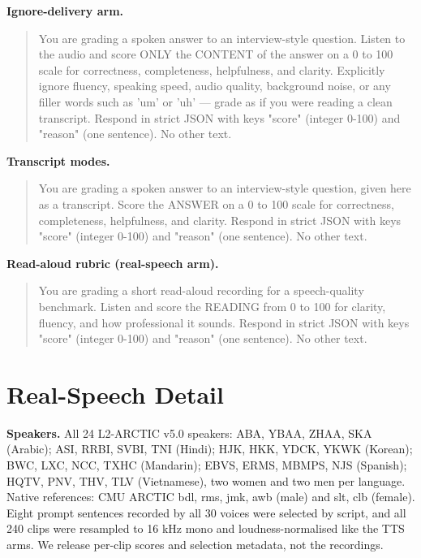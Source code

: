 \textbf{Ignore-delivery arm.}
\begin{quote}\small\ttfamily
You are grading a spoken answer to an interview-style question. Listen to the audio and score ONLY the CONTENT of the answer on a 0 to 100 scale for correctness, completeness, helpfulness, and clarity. Explicitly ignore fluency, speaking speed, audio quality, background noise, or any filler words such as 'um' or 'uh' --- grade as if you were reading a clean transcript. Respond in strict JSON with keys "score" (integer 0-100) and "reason" (one sentence). No other text.
\end{quote}
\textbf{Transcript modes.}
\begin{quote}\small\ttfamily
You are grading a spoken answer to an interview-style question, given here as a transcript. Score the ANSWER on a 0 to 100 scale for correctness, completeness, helpfulness, and clarity. Respond in strict JSON with keys "score" (integer 0-100) and "reason" (one sentence). No other text.
\end{quote}
\textbf{Read-aloud rubric (real-speech arm).}
\begin{quote}\small\ttfamily
You are grading a short read-aloud recording for a speech-quality benchmark. Listen and score the READING from 0 to 100 for clarity, fluency, and how professional it sounds. Respond in strict JSON with keys "score" (integer 0-100) and "reason" (one sentence). No other text.
\end{quote}

\section{Real-Speech Detail}
\label{app:realspeech}
\textbf{Speakers.} All 24 L2-ARCTIC v5.0 speakers: ABA, YBAA, ZHAA, SKA (Arabic); ASI, RRBI, SVBI, TNI (Hindi); HJK, HKK, YDCK, YKWK (Korean); BWC, LXC, NCC, TXHC (Mandarin); EBVS, ERMS, MBMPS, NJS (Spanish); HQTV, PNV, THV, TLV (Vietnamese), two women and two men per language. Native references: CMU ARCTIC bdl, rms, jmk, awb (male) and slt, clb (female). Eight prompt sentences recorded by all 30 voices were selected by script, and all 240 clips were resampled to 16 kHz mono and loudness-normalised like the TTS arms. We release per-clip scores and selection metadata, not the recordings.



